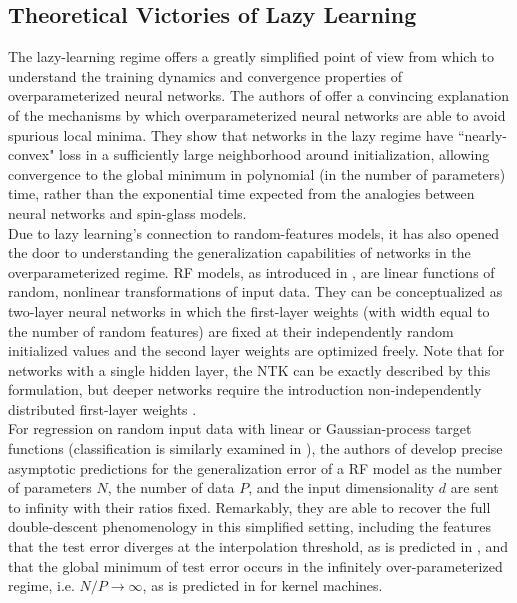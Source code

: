 \documentclass[a4paper, 12pt]{article}
\begin{document}
\subsection{Theoretical Victories of Lazy Learning}

The lazy-learning regime offers a greatly simplified point of view from which to understand the training dynamics and convergence properties of overparameterized neural networks. The authors of \cite{allen-zhuConvergenceTheoryDeep2019} offer a convincing explanation of the mechanisms by which overparameterized neural networks are able to avoid spurious local minima. They show that networks in the lazy regime have ``nearly-convex" loss in a sufficiently large neighborhood around initialization, allowing convergence to the global minimum in polynomial (in the number of parameters) time, rather than the exponential time expected from the analogies between neural networks and spin-glass models.\\

Due to lazy learning's connection to random-features models, it has also opened the door to understanding the generalization capabilities of networks in the overparameterized regime. RF models, as introduced in \cite{rahimiRandomFeaturesLargeScale2008}, are linear functions of random, nonlinear transformations of input data. They can be conceptualized as two-layer neural networks in which the first-layer weights (with width equal to the number of random features) are fixed at their independently random initialized values and the second layer weights are optimized freely. Note that for networks with a single hidden layer, the NTK can be exactly described by this formulation, but deeper networks require the introduction non-independently distributed first-layer weights \cite{chizatLazyTrainingDifferentiable2020}. \\

For regression on random input data with linear or Gaussian-process target functions (classification is similarly examined in \cite{dengModelDoubleDescent2020}), the authors of \cite{meiGeneralizationErrorRandom2019} develop precise asymptotic predictions for the generalization error of a RF model as the number of parameters $N$, the number of data $P$, and the input dimensionality $d$ are sent to infinity with their ratios fixed. Remarkably, they are able to recover the full double-descent phenomenology in this simplified setting, including the features that the test error diverges at the interpolation threshold, as is predicted in \cite{geigerScalingDescriptionGeneralization2019}, and that the global minimum of test error occurs in the infinitely over-parameterized regime, i.e. $N/P\rightarrow\infty$, as is predicted in \cite{belkinReconcilingModernMachine2019,belkinUnderstandDeepLearning2018} for kernel machines.\\
\end{document}
